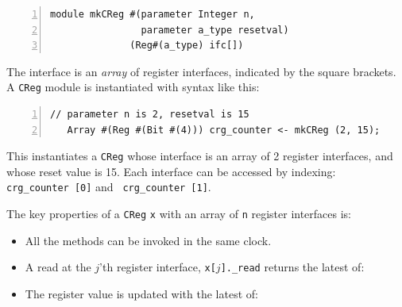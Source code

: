 {\small
\begin{Verbatim}[frame=single, numbers=left]
module mkCReg #(parameter Integer n,
                parameter a_type resetval)
              (Reg#(a_type) ifc[])
\end{Verbatim}
}

The interface is an \emph{array} of register interfaces, indicated by
the square brackets.  A \verb|CReg| module is instantiated with syntax
like this:

{\small
\begin{Verbatim}[frame=single, numbers=left]
   // parameter n is 2, resetval is 15
   Array #(Reg #(Bit #(4))) crg_counter <- mkCReg (2, 15);
\end{Verbatim}
}

This instantiates a \verb|CReg| whose interface is an array of 2
register interfaces, and whose reset value is 15.  Each interface can
be accessed by indexing: {\tt crg\_counter~[0]} and {\tt
crg\_counter~[1]}.

The key properties of a \verb|CReg| \verb|x| with an array of \verb|n|
register interfaces is:

\begin{itemize}
 \item All the methods can be invoked in the same clock.

 \item A read at the $j$'th register interface,{\ie} {\tt x[$j$].\_read}
       returns the latest of:


 \item The register value is updated with the latest of:

\end{itemize}

